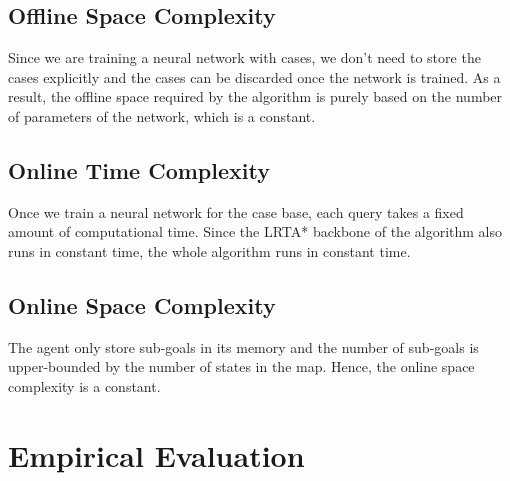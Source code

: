 \documentclass[letterpaper]{article}
\numberwithin{equation}{section}
\numberwithin{theorem}{section}
\numberwithin{lemma}{section}
\numberwithin{df}{section}
\begin{document}
    \subsection{Offline Space Complexity}\label{subsec:offline-space-complexity}
    Since we are training a neural network with cases, we don't need to store the cases explicitly and the cases can be discarded once the network is trained.
    As a result, the offline space required by the algorithm is purely based on the number of parameters of the network, which is a constant.

    \subsection{Online Time Complexity}\label{subsec:online-complexity}
    Once we train a neural network for the case base, each query takes a fixed amount of computational time.
    Since the LRTA* backbone of the algorithm also runs in constant time, the whole algorithm runs in constant time.

    \subsection{Online Space Complexity}\label{subsec:online-space-complexity}
    The agent only store sub-goals in its memory and the number of sub-goals is upper-bounded by the number of states in the map.
    Hence, the online space complexity is a constant.


    \section{Empirical Evaluation}\label{sec:empirical-evaluation}



\end{document}
